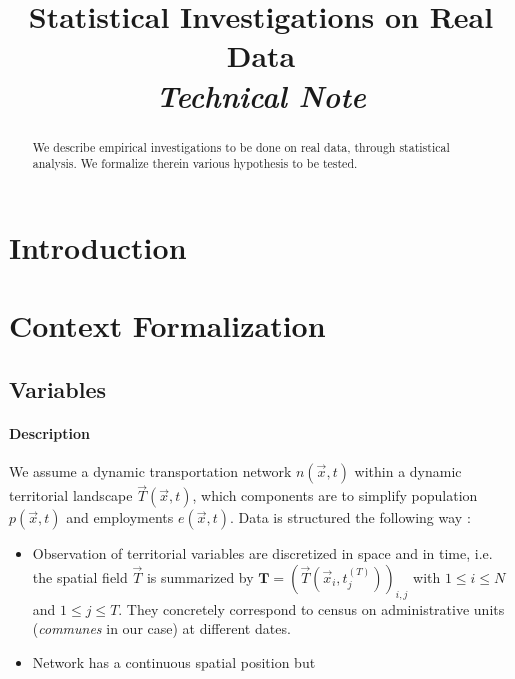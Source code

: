 


\title{Statistical Investigations on Real Data\bigskip\\
\textit{Technical Note}
}
\author{}
\date{}


\maketitle

\justify


\begin{abstract}
We describe empirical investigations to be done on real data, through statistical analysis. We formalize therein various hypothesis to be tested.
\end{abstract}


\section{Introduction}


\section{Context Formalization}

\subsection{Variables}

\paragraph{Description}

We assume a dynamic transportation network $n(\vec{x},t)$ within a dynamic territorial landscape $\vec{T}(\vec{x},t)$, which components are to simplify population $p(\vec{x},t)$ and employments $e(\vec{x},t)$. Data is structured the following way :
\begin{itemize}
\item Observation of territorial variables are discretized in space and in time, i.e. the spatial field $\vec{T}$ is summarized by $\mathbf{T} = \left(\vec{T}(\vec{x}_i,t_j^{(T)})\right)_{i,j}$ with $1\leq i \leq N$ and $1\leq j \leq T$. They concretely correspond to census on administrative units (\emph{communes} in our case) at different dates.
\item Network has a continuous spatial position but
\end{itemize}



